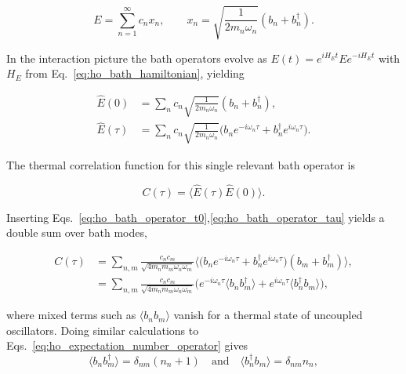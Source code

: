 \begin{equation} \label{eq:ho_bath_operator}
	E = \sum_{n=1}^{\infty} c_n x_n, \qquad x_n = \sqrt{\frac{1}{2 m_n \omega_n}} (b_n + b_n^{\dagger}).
\end{equation}

\noindent
In the interaction picture the bath operators evolve as $E(t) = e^{i H_E t} E e^{-i H_E t}$ with $H_E$ from Eq.~\eqref{eq:ho_bath_hamiltonian}, yielding

\begin{align}
	\hat{E}(0)    & = \sum_{n} c_n \sqrt{\frac{1}{2 m_n \omega_n}} (b_n + b_n^{\dagger}), 
	\label{eq:ho_bath_operator_t0}                                                   \\
	\hat{E}(\tau) & = \sum_{n} c_n \sqrt{\frac{1}{2 m_n \omega_n}} \Big(b_n e^{-i \omega_n \tau} + b_n^{\dagger} e^{i \omega_n \tau}\Big). \label{eq:ho_bath_operator_tau}
\end{align}

\noindent
The thermal correlation function  for this single relevant bath operator is

\begin{equation} \label{eq:ho_bath_correlator}
	C(\tau) = \langle \hat{E}(\tau) \hat{E}(0) \rangle.
\end{equation}

\noindent
Inserting Eqs.~\eqref{eq:ho_bath_operator_t0},\eqref{eq:ho_bath_operator_tau} yields a double sum over bath modes,

\begin{align}
	C(\tau) &= \sum_{n,m} \frac{c_n c_m}{\sqrt{4 m_n m_m \omega_n \omega_m}} \Big\langle \big(b_n e^{-i \omega_n \tau} + b_n^{\dagger} e^{i \omega_n \tau}\big) (b_m + b_m^{\dagger}) \Big\rangle, \\[0.3em]
	&= \sum_{n,m} \frac{c_n c_m}{\sqrt{4 m_n m_m \omega_n \omega_m}} \Big( e^{-i \omega_n \tau} \langle b_n b_m^{\dagger} \rangle + e^{i \omega_n \tau} \langle b_n^{\dagger} b_m \rangle \Big),
	\label{eq:ho_correlator_intermediate}
\end{align}

\noindent
where mixed terms such as $\langle b_n b_m \rangle$ vanish for a thermal state of uncoupled oscillators.
Doing similar calculations to Eqs.~\eqref{eq:ho_expectation_number_operator} gives
\begin{equation}
	\langle b_n b_m^{\dagger} \rangle = \delta_{nm}(n_n+1) \quad \text{and} \quad \langle b_n^{\dagger} b_m \rangle = \delta_{nm} n_n,
\end{equation}

